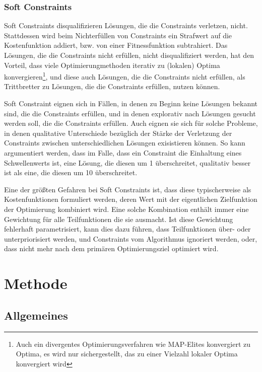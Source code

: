 \subsubsection{Soft Constraints}
Soft Constraints disqualifizieren Lösungen, die die Constraints verletzen, nicht.
Stattdessen wird beim Nichterfüllen von Constraints ein Strafwert auf die Kostenfunktion addiert, bzw. von einer Fitnessfunktion subtrahiert.
Das Lösungen, die die Constraints nicht erfüllen, nicht disqualifiziert werden, hat den Vorteil, dass viele Optimierungmethoden iterativ zu (lokalen) Optima konvergieren\footnote{Auch ein divergentes Optimierungsverfahren wie MAP-Elites konvergiert zu Optima, es wird nur sichergestellt, das zu einer Vielzahl lokaler Optima konvergiert wird}, 
und diese auch Lösungen, die die Constraints nicht erfüllen, als Trittbretter zu Lösungen, die die Constraints erfüllen, nutzen können.

Soft Constraint eignen sich in Fällen, in denen zu Beginn keine Lösungen bekannt sind, die die Constraints erfüllen, und in denen explorativ nach Lösungen gesucht werden soll, die die Constraints erfüllen.
Auch eignen sie sich für solche Probleme, in denen qualitative Unterschiede bezüglich der Stärke der Verletzung der Constraints zwischen unterschiedlichen Lösungen exisistieren können.
So kann argumentiert werden, dass im Falle, dass ein Constraint die Einhaltung eines Schwellenwerts ist, eine Lösung, die diesen um 1 überschreitet, qualitativ besser ist als eine, die diesen um 10 überschreitet.

Eine der größten Gefahren bei Soft Constraints ist, dass diese typischerweise als Kostenfunktionen formuliert werden, deren Wert mit der eigentlichen Zielfunktion der Optimierung kombiniert wird.
Eine solche Kombination enthält immer eine Gewichtung für alle Teilfunktionen die sie ausmacht.
Ist diese Gewichtung fehlerhaft parametrisiert, kann dies dazu führen, dass Teilfunktionen über- oder unterpriorisiert werden, und Constraints vom Algorithmus ignoriert werden, oder, dass nicht mehr nach dem primären Optimierungsziel optimiert wird.




\section{Methode}

\subsection{Allgemeines}

